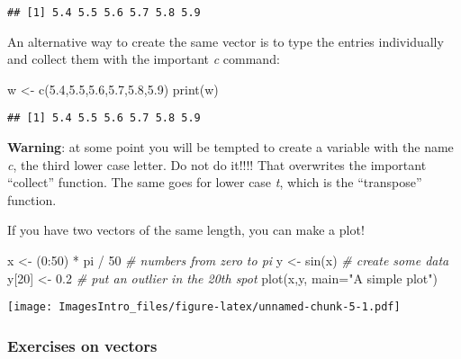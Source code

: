 \documentclass[
]{article}
\newenvironment{Shaded}{\begin{snugshade}}{\end{snugshade}}
\newcommand{\AttributeTok}[1]{\textcolor[rgb]{0.77,0.63,0.00}{#1}}
\newcommand{\CommentTok}[1]{\textcolor[rgb]{0.56,0.35,0.01}{\textit{#1}}}
\newcommand{\DecValTok}[1]{\textcolor[rgb]{0.00,0.00,0.81}{#1}}
\newcommand{\FloatTok}[1]{\textcolor[rgb]{0.00,0.00,0.81}{#1}}
\newcommand{\FunctionTok}[1]{\textcolor[rgb]{0.00,0.00,0.00}{#1}}
\newcommand{\NormalTok}[1]{#1}
\newcommand{\OtherTok}[1]{\textcolor[rgb]{0.56,0.35,0.01}{#1}}
\newcommand{\SpecialCharTok}[1]{\textcolor[rgb]{0.00,0.00,0.00}{#1}}
\newcommand{\StringTok}[1]{\textcolor[rgb]{0.31,0.60,0.02}{#1}}
\begin{document}
\begin{verbatim}
## [1] 5.4 5.5 5.6 5.7 5.8 5.9
\end{verbatim}

An alternative way to create the same vector is to type the entries
individually and collect them with the important \emph{c} command:

\begin{Shaded}
\begin{Highlighting}[]
\NormalTok{w }\OtherTok{\textless{}{-}} \FunctionTok{c}\NormalTok{(}\FloatTok{5.4}\NormalTok{,}\FloatTok{5.5}\NormalTok{,}\FloatTok{5.6}\NormalTok{,}\FloatTok{5.7}\NormalTok{,}\FloatTok{5.8}\NormalTok{,}\FloatTok{5.9}\NormalTok{)}
\FunctionTok{print}\NormalTok{(w)}
\end{Highlighting}
\end{Shaded}

\begin{verbatim}
## [1] 5.4 5.5 5.6 5.7 5.8 5.9
\end{verbatim}

\textbf{Warning}: at some point you will be tempted to create a variable
with the name \emph{c}, the third lower case letter. Do not do it!!!!
That overwrites the important ``collect'' function. The same goes for
lower case \emph{t}, which is the ``transpose'' function.

If you have two vectors of the same length, you can make a plot!

\begin{Shaded}
\begin{Highlighting}[]
\NormalTok{x }\OtherTok{\textless{}{-}}\NormalTok{ (}\DecValTok{0}\SpecialCharTok{:}\DecValTok{50}\NormalTok{)  }\SpecialCharTok{*}\NormalTok{ pi }\SpecialCharTok{/} \DecValTok{50} \CommentTok{\# numbers from zero to pi  }
\NormalTok{y }\OtherTok{\textless{}{-}} \FunctionTok{sin}\NormalTok{(x)  }\CommentTok{\# create some data }
\NormalTok{y[}\DecValTok{20}\NormalTok{] }\OtherTok{\textless{}{-}} \FloatTok{0.2} \CommentTok{\# put an outlier in the 20th spot}
\FunctionTok{plot}\NormalTok{(x,y, }\AttributeTok{main=}\StringTok{"A simple plot"}\NormalTok{)}
\end{Highlighting}
\end{Shaded}

\texttt{[image: ImagesIntro\_files/figure-latex/unnamed-chunk-5-1.pdf]}

\hypertarget{exercises-on-vectors}{%
\subsubsection{Exercises on vectors}\label{exercises-on-vectors}}
\end{document}
